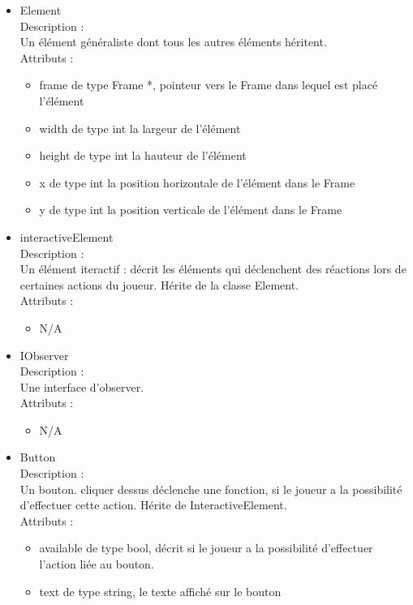 \documentclass[a4paper,12pt]{article}
\begin{document}
\begin{itemize}
\begin{itemize}
\end{itemize}
\item Element\\
Description :\\
Un élément généraliste dont tous les autres éléments héritent.\\
Attributs :
\begin{itemize}
\item frame de type Frame *, pointeur vers le Frame dans lequel est placé l'élément
\item width de type int la largeur de l'élément
\item height de type int la hauteur de l'élément
\item x de type int la position horizontale de l'élément dans le Frame
\item y de type int la position verticale de l'élément dans le  Frame\\
\end{itemize}
\item interactiveElement\\
Description :\\
Un élément iteractif : décrit les éléments qui déclenchent des réactions lors de certaines actions du joueur. Hérite de la classe Element.\\
Attributs :
\begin{itemize}
\item  N/A \\
\end{itemize}
\item IObserver\\
Description :\\
Une interface d'observer.\\
Attributs :
\begin{itemize}
\item N/A \\
\end{itemize}
\item Button\\
Description :\\
Un bouton. cliquer dessus déclenche une fonction, si le joueur a la possibilité d'effectuer cette action. Hérite de InteractiveElement.\\
Attributs :
\begin{itemize}
\item available de type bool, décrit si le joueur a la possibilité d'effectuer l'action liée au bouton.
\item text de type string, le texte affiché sur le bouton\\

\end{itemize}
\end{itemize}
\end{document}
